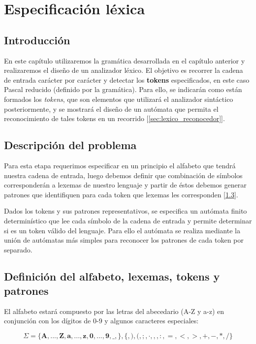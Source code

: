 \chapter{Especificación léxica}

\section{Introducción}
En este capítulo utilizaremos la gramática desarrollada en el capítulo anterior y realizaremos el diseño de un analizador léxico. El objetivo es recorrer la cadena de entrada carácter por carácter y detectar los {\bf tokens} especificados, en este caso Pascal reducido (definido por la gramática).
Para ello, se indicarán como están formados los \emph{tokens}, que son elementos que utilizará el analizador sintáctico posteriormente, y se mostrará el diseño de un autómata que permita el reconocimiento de tales tokens en un recorrido [\ref{sec:lexico_reconocedor}].

\section{Descripción del problema}
Para esta etapa requerimos especificar en un principio el alfabeto que tendrá nuestra cadena de entrada, luego debemos definir que combinación de símbolos corresponderán a lexemas de nuestro lenguaje y partir de éstos debemos generar patrones que identifiquen para cada token que lexemas les corresponden [\ref{sec:lexico_definicion}].

Dados los tokens y sus patrones representativos, se especifica un autómata finito determinístico que lee cada símbolo de la cadena de entrada y permite determinar si es un token válido del lenguaje. Para ello el autómata se realiza mediante la unión de autómatas más simples para reconocer los patrones de cada token por separado.

\section{Definición del alfabeto, lexemas, tokens y patrones}
\label{sec:lexico_definicion}
El alfabeto estará compuesto por las letras del abecedario (A-Z y a-z) en conjunción con los dígitos de 0-9 y algunos caracteres especiales:

$$ \Sigma = \{ \bm{A}, ..., \bm{Z}, \bm{a}, ..., \bm{z}, \bm{0}, ..., \bm{9}, \bm{\_}, \bm{\}}, \bm{\{}, \bm{)}, \bm{(}, \bm{;}, \bm{\cdot}, \bm{,}, \bm{:}, \bm{=}, \bm{<}, \bm{>}, \bm{+}, \bm{-}, \bm{*}, \bm{/} \}$$

